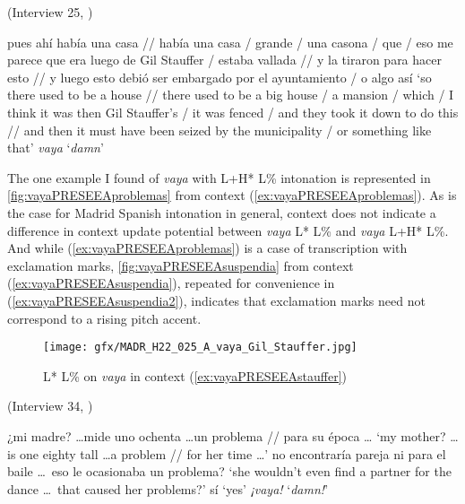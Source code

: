 \begin{exe}
	\ex  (Interview 25, \cite{PRESEEA.20142020})\label{ex:vayaPRESEEAstauffer}
	\begin{xlist}[A:]
	  pues ahí había una casa // había una casa / grande / una casona / que / eso me parece que era luego de Gil Stauffer / estaba vallada // y la tiraron para hacer esto // y luego esto debió ser embargado por el ayuntamiento / o algo así  
	\glt `so there used to be a house // there used to be a big house / a mansion / which / I think it was then Gil Stauffer's / it was fenced / and they took it down to do this // and then it must have been seized by the municipality / or something like that'
	  \textit{vaya}
	\glt `\textit{damn}' 
	\end{xlist}
\end{exe}


The one example I found of \textit{vaya} with L+H* L\% intonation is represented in \autoref{fig:vayaPRESEEAproblemas} from context (\ref{ex:vayaPRESEEAproblemas}). As is the case for Madrid Spanish intonation in general, context does not indicate a difference in context update potential between \textit{vaya} L* L\% and \textit{vaya} L+H* L\%. And while (\ref{ex:vayaPRESEEAproblemas}) is a case of transcription with exclamation marks, \autoref{fig:vayaPRESEEAsuspendia} from context (\ref{ex:vayaPRESEEAsuspendia}), repeated for convenience in (\ref{ex:vayaPRESEEAsuspendia2}), indicates that exclamation marks need not correspond to a rising pitch accent.

\begin{figure}[p]
	\texttt{[image: gfx/MADR\_H22\_025\_A\_vaya\_Gil\_Stauffer.jpg]}
	\caption[L* L\% on \textit{vaya} in context (\ref{ex:vayaPRESEEAstauffer})]{L* L\% on \textit{vaya} in context (\ref{ex:vayaPRESEEAstauffer}) \href{https://osf.io/d862v/}{\faVolumeUp} \label{fig:vayaPRESEEAstauffer}}
\end{figure}\clearpage

\begin{exe}
	\ex (Interview 34, \cite{PRESEEA.20142020}) \label{ex:vayaPRESEEAproblemas}
	\begin{xlist}[A:]
	  ¿mi madre? \ldots mide uno ochenta \ldots un problema // para su época \ldots 
	\glt `my mother? \ldots is one eighty tall \ldots a problem // for her time \ldots' 
	  no encontraría pareja ni para el baile \ldots ~eso le ocasionaba un problema?
	\glt `she wouldn't even find a partner for the dance \ldots ~that caused her problems?' 
	  sí 
	\glt `yes' 
	 \textit{¡vaya!} 
	\glt `\textit{damn!}'
	\end{xlist}
\end{exe}

